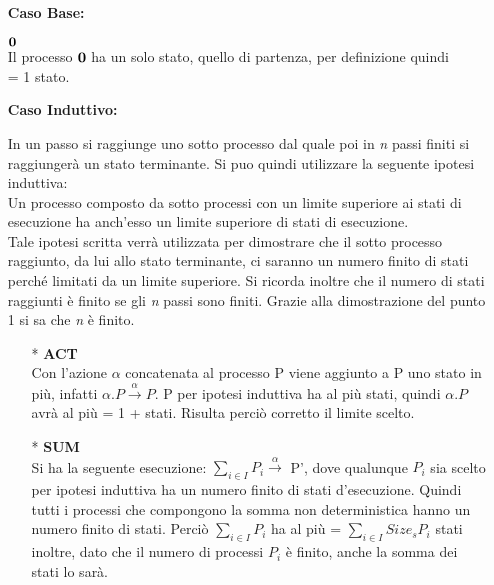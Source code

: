 \begin{itemize}
	\item[] \textbf{Caso Base:} \mbox{}
	
	 $\mathbf{0}$
	\\
	Il processo $\mathbf{0}$ ha un solo stato, quello di partenza, per definizione quindi\\ \sis{\zero} = 1 stato.
		\\
	\item[] \textbf{Caso Induttivo:} \mbox{}
	
	In un passo si raggiunge uno sotto processo dal quale poi in \textit{n} passi finiti si raggiungerà un stato terminante. Si puo quindi utilizzare la seguente ipotesi induttiva: \\
	Un processo composto da sotto processi con un limite superiore ai stati di esecuzione ha anch'esso un limite superiore di stati di esecuzione.\\
	Tale ipotesi scritta verrà utilizzata per dimostrare che il sotto processo raggiunto, da lui allo stato terminante, ci saranno un numero finito di stati perché limitati da un limite superiore. Si ricorda inoltre che il numero di stati raggiunti è finito se gli \textit{n} passi sono finiti. Grazie alla dimostrazione del punto 1 si sa che \textit{n} è finito. 
	\\
	\begin{itemize}
		
		\item[*] \textbf{ACT}
		\\
		Con l'azione $\alpha$ concatenata al processo P viene aggiunto a P uno stato in più, infatti $\alpha.P \overset{\alpha}\rightarrow P$. P per ipotesi induttiva ha al più  stati, quindi $\alpha.P$ avrà al più  = 1 +  stati. Risulta perciò corretto il limite scelto.
		\\
		\item[*] \textbf{SUM}
		\\
		Si ha la seguente esecuzione: $\displaystyle\sum_{i\in I}^{}P_{i} \overset{\alpha}\rightarrow$ P', dove qualunque $P_{i}$ sia scelto per ipotesi induttiva ha un numero finito di stati d'esecuzione. Quindi tutti i processi che compongono la somma non deterministica hanno un numero finito di stati.
		Perciò $\displaystyle\sum_{i\in I}^{}P_{i}$ ha al più  = $\displaystyle\sum_{i\in I}^{}Size_{s}{P_{i}}$ stati inoltre, dato che il numero di processi $P_{i}$ è finito, anche la somma dei stati lo sarà.
		

\end{itemize}
\end{itemize}
